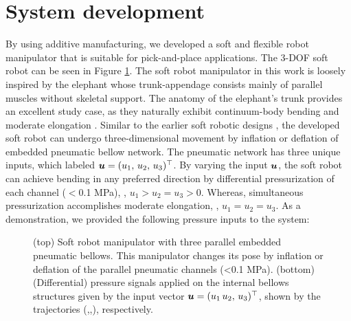 \section{System development}
By using additive manufacturing, we developed a soft and flexible robot manipulator that is suitable for pick-and-place applications. The 3-DOF soft robot can be seen in Figure \ref{fig:C2:soft_robot}. The soft robot manipulator in this work is loosely inspired by the elephant whose trunk-appendage consists mainly of parallel muscles without skeletal support. The anatomy of the elephant's trunk provides an excellent study case, as they naturally exhibit continuum-body bending and moderate elongation \cite{Falkenhahn2015,Jones2006,Tatlicioglu2007}. Similar to the earlier soft robotic designs
\cite{Suzumori1991,Falkenhahn2015}, the developed soft robot can undergo three-dimensional movement by inflation or deflation of embedded pneumatic bellow network. The pneumatic network has three unique inputs, which labeled ${\boldsymbol{u}} = (u_1,\,u_2,\,u_3)^\top$. By varying the input ${\boldsymbol{u}}$, the soft robot can achieve bending in any preferred direction by differential pressurization of each channel ($<$0.1 \si{\mega \pascal}), \eg, $u_1 > u_2 = u_3 > 0$. Whereas, simultaneous pressurization accomplishes moderate elongation, \ie, $u_1 = u_2 = u_3$. As a demonstration, we provided the following pressure inputs to the system:

\begin{figure}[!h]
 \vspace{-3mm}
  \centering
  
   \vspace{2mm}
    
     \vspace{-3mm}
    
  \caption{(top) Soft robot manipulator with three parallel embedded pneumatic bellows. This manipulator changes its pose by inflation or deflation of the parallel pneumatic channels (<0.1 \si{\mega \pascal}). (bottom) (Differential) pressure signals applied on the internal bellows structures given by the input vector ${\boldsymbol{u}} = (u_1\,u_2,\,u_3)^\top$, shown by the trajectories (,,), respectively.}
  \vspace{-0.1cm}
  \label{fig:C2:soft_robot}
\end{figure}
%

